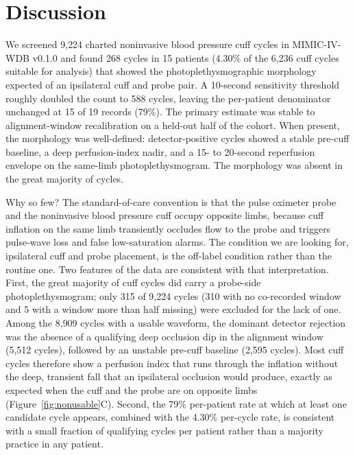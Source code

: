 \documentclass[twocolumn,letterpaper,10pt]{article}
\begin{document}
\section{Discussion}

We screened 9{,}224 charted noninvasive blood pressure cuff cycles in MIMIC-IV-WDB v0.1.0 and found 268 cycles in 15 patients (4.30\% of the 6{,}236 cuff cycles suitable for analysis) that showed the photoplethysmographic morphology expected of an ipsilateral cuff and probe pair. A 10-second sensitivity threshold roughly doubled the count to 588 cycles, leaving the per-patient denominator unchanged at 15 of 19 records (79\%). The primary estimate was stable to alignment-window recalibration on a held-out half of the cohort. When present, the morphology was well-defined: detector-positive cycles showed a stable pre-cuff baseline, a deep perfusion-index nadir, and a 15- to 20-second reperfusion envelope on the same-limb photoplethysmogram. The morphology was absent in the great majority of cycles.

Why so few? The standard-of-care convention is that the pulse oximeter probe and the noninvasive blood pressure cuff occupy opposite limbs, because cuff inflation on the same limb transiently occludes flow to the probe and triggers pulse-wave loss and false low-saturation alarms.\cite{kitamoto2020_samesidecuff,sondej2022_cuff_spo2,kawagishi2004_oximeter_failuretimes} The condition we are looking for, ipsilateral cuff and probe placement, is the off-label condition rather than the routine one. Two features of the data are consistent with that interpretation. First, the great majority of cuff cycles did carry a probe-side photoplethysmogram; only 315 of 9{,}224 cycles (310 with no co-recorded window and 5 with a window more than half missing) were excluded for the lack of one. Among the 8{,}909 cycles with a usable waveform, the dominant detector rejection was the absence of a qualifying deep occlusion dip in the alignment window (5{,}512 cycles), followed by an unstable pre-cuff baseline (2{,}595 cycles). Most cuff cycles therefore show a perfusion index that runs through the inflation without the deep, transient fall that an ipsilateral occlusion would produce, exactly as expected when the cuff and the probe are on opposite limbs (Figure~\ref{fig:nonusable}C). Second, the 79\% per-patient rate at which at least one candidate cycle appears, combined with the 4.30\% per-cycle rate, is consistent with a small fraction of qualifying cycles per patient rather than a majority practice in any patient.
\end{document}

